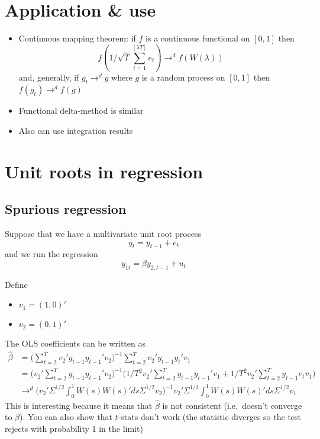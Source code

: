 \section{Application \& use}

\begin{itemize}
\item Continuous mapping theorem: if $f$ is a continuous functional on
  $[0,1]$ then \[f(1/\sqrt{T} \sum_{t=1}^{[λT]} e_t) →^d f(W(λ))\]
  and, generally, if $g_t →^d g$ where $g$ is a random process on
  $[0,1]$ then $f(g_t) →^d f(g)$
\item Functional delta-method is similar
\item Also can use integration results
\end{itemize}

\section{Unit roots in regression}

\subsection{Spurious regression}

Suppose that we have a multivariate unit root process
\[y_t = y_{t-1} + e_t\] and we run the regression
\[y_{1t} = β y_{2,t-1} + u_t\]

Define

\begin{itemize}
\item $v_1 = (1, 0)'$
\item $v_2 = (0, 1)'$
\end{itemize}

The OLS coefficients can be written as
\begin{equation}
  \begin{split}
    \hat β &= \Big(\sum_{t=2}^T v_2' y_{t-1} y_{t-1}' v_2\Big)^{-1}
    \sum_{t=2}^T v_2' y_{t-1} y_t' v_1 \\
    &= \Big(v_2' \sum_{t=2}^T y_{t-1} y_{t-1}' v_2 \Big)^{-1} \Big(
    1/T^2 v_2' \sum_{t=2}^T y_{t-1} y_{t-1}' v_1
    + 1/T^2 v_2' \sum_{t=2}^T y_{t-1} e_t v_1 \Big) \\
    &→^d \Big(v_2' Σ^{1/2} \int_0^1 W(s) W(s)' ds Σ^{1/2}
    v_2\Big)^{-1} v_2' Σ^{1/2} \int_0^1 W(s) W(s)' ds Σ^{1/2} v_1
\end{split}
\end{equation}
This is interesting because it means that $\hat β$ is not consistent
(i.e.~doesn't converge to $β$). You can also show that $t$-stats don't
work (the statistic diverges so the test rejects with probability 1 in
the limit)

